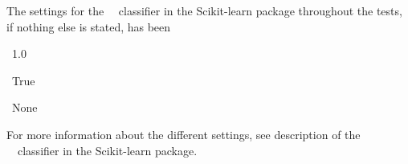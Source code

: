 The settings for the \mn\ \nb\ classifier in the Scikit-learn package throughout the tests, if nothing else is stated, has been
\begin{description}[noitemsep,labelindent=0.5cm]
\small
	\item[Alpha:] \ 1.0
	\item[Fit prior:]\ True
	\item[Class prior:] \ None
\end{description}
For more information about the different settings, see description of the \mn\ \nb\ classifier in the Scikit-learn package.